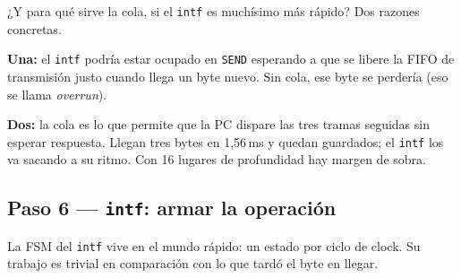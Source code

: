 \documentclass[11pt,a4paper]{article}
\newcommand{\sg}[1]{\texttt{\small #1}}
\begin{document}
\begin{intuicion}{¿Y para qu\'e sirve la cola, si el \texttt{intf} es much\'isimo
m\'as r\'apido?}
Dos razones concretas.

\smallskip
\textbf{Una:} el \sg{intf} podr\'ia estar ocupado en \sg{SEND} esperando a que
se libere la FIFO de transmisi\'on justo cuando llega un byte nuevo. Sin cola,
ese byte se perder\'ia (eso se llama \emph{overrun}).

\smallskip
\textbf{Dos:} la cola es lo que permite que la PC dispare las tres tramas
seguidas sin esperar respuesta. Llegan tres bytes en 1,56\,ms y quedan
guardados; el \sg{intf} los va sacando a su ritmo. Con 16 lugares de
profundidad hay margen de sobra.
\end{intuicion}

\subsection{Paso 6 --- \texttt{intf}: armar la operaci\'on}

La FSM del \sg{intf} vive en el mundo r\'apido: un estado por ciclo de clock.
Su trabajo es trivial en comparaci\'on con lo que tard\'o el byte en llegar.
\end{document}
